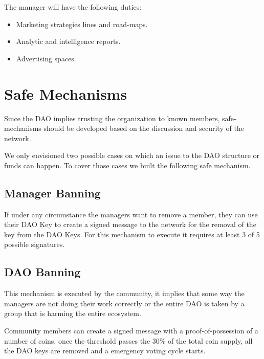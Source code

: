 \documentclass{article}
\begin{document}
The manager will have the following duties:

\begin{itemize}
  \item Marketing strategies lines and road-maps.
  \item Analytic and intelligence reports.
  \item Advertising spaces.
\end{itemize}

\section{Safe Mechanisms}

Since the DAO implies trusting the organization to known members, safe-mechanisms should be developed based on the discussion and security of the network.

We only envisioned two possible cases on which an issue to the DAO structure or funds can happen. To cover those cases we built the following safe mechanism.

\subsection{Manager Banning}

If under any circumstance the managers want to remove a member, they can use their DAO Key to create a signed message to the network for the removal of the key from the DAO Keys. For this mechanism to execute it requires at least 3 of 5 possible signatures.

\subsection{DAO Banning}

This mechanism is executed by the community, it implies that some way the managers are not doing their work correctly or the entire DAO is taken by a group that is harming the entire ecosystem.

Community members can create a signed message with a proof-of-possession of a number of coins, once the threshold passes the 30\% of the total coin supply, all the DAO keys are removed and a emergency voting cycle starts.
\end{document}
